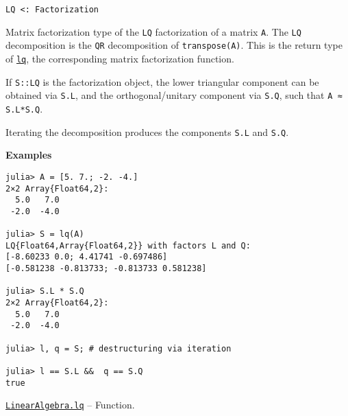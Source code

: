 \begin{adjustwidth}{2em}{0pt}


\begin{verbatim}
LQ <: Factorization
\end{verbatim}

Matrix factorization type of the \texttt{LQ} factorization of a matrix \texttt{A}. The \texttt{LQ} decomposition is the \texttt{QR} decomposition of \texttt{transpose(A)}. This is the return type of \hyperlink{1096124289761034610}{\texttt{lq}}, the corresponding matrix factorization function.

If \texttt{S::LQ} is the factorization object, the lower triangular component can be obtained via \texttt{S.L}, and the orthogonal/unitary component via \texttt{S.Q}, such that \texttt{A ≈ S.L*S.Q}.

Iterating the decomposition produces the components \texttt{S.L} and \texttt{S.Q}.

\textbf{Examples}


\begin{verbatim}
julia> A = [5. 7.; -2. -4.]
2×2 Array{Float64,2}:
  5.0   7.0
 -2.0  -4.0

julia> S = lq(A)
LQ{Float64,Array{Float64,2}} with factors L and Q:
[-8.60233 0.0; 4.41741 -0.697486]
[-0.581238 -0.813733; -0.813733 0.581238]

julia> S.L * S.Q
2×2 Array{Float64,2}:
  5.0   7.0
 -2.0  -4.0

julia> l, q = S; # destructuring via iteration

julia> l == S.L &&  q == S.Q
true
\end{verbatim}



\end{adjustwidth}
\hypertarget{1096124289761034610}{} 
\hyperlink{1096124289761034610}{\texttt{LinearAlgebra.lq}}  -- {Function.}

